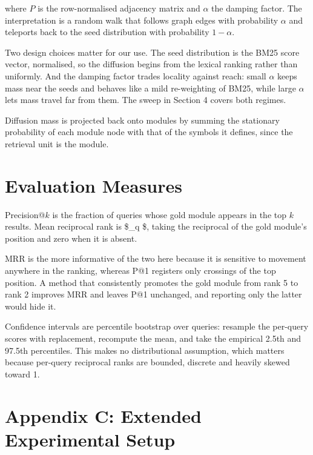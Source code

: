 \documentclass[10pt,twocolumn,letterpaper]{article}
\begin{document}
where $P$ is the row-normalised adjacency matrix and $\alpha$ the damping factor. The interpretation is a random walk that follows graph edges with probability $\alpha$ and teleports back to the seed distribution with probability $1 - \alpha$.

Two design choices matter for our use. The seed distribution is the BM25 score vector, normalised, so the diffusion begins from the lexical ranking rather than uniformly. And the damping factor trades locality against reach: small $\alpha$ keeps mass near the seeds and behaves like a mild re-weighting of BM25, while large $\alpha$ lets mass travel far from them. The sweep in Section 4 covers both regimes.

Diffusion mass is projected back onto modules by summing the stationary probability of each module node with that of the symbols it defines, since the retrieval unit is the module.


\section{Evaluation Measures}


Precision@$k$ is the fraction of queries whose gold module appears in the top $k$ results. Mean reciprocal rank is \$\sum\_{q} \$, taking the reciprocal of the gold module's position and zero when it is absent.

MRR is the more informative of the two here because it is sensitive to movement anywhere in the ranking, whereas P@1 registers only crossings of the top position. A method that consistently promotes the gold module from rank 5 to rank 2 improves MRR and leaves P@1 unchanged, and reporting only the latter would hide it.

Confidence intervals are percentile bootstrap over queries: resample the per-query scores with replacement, recompute the mean, and take the empirical 2.5th and 97.5th percentiles. This makes no distributional assumption, which matters because per-query reciprocal ranks are bounded, discrete and heavily skewed toward 1.




\section{Appendix C: Extended Experimental Setup}
\end{document}
